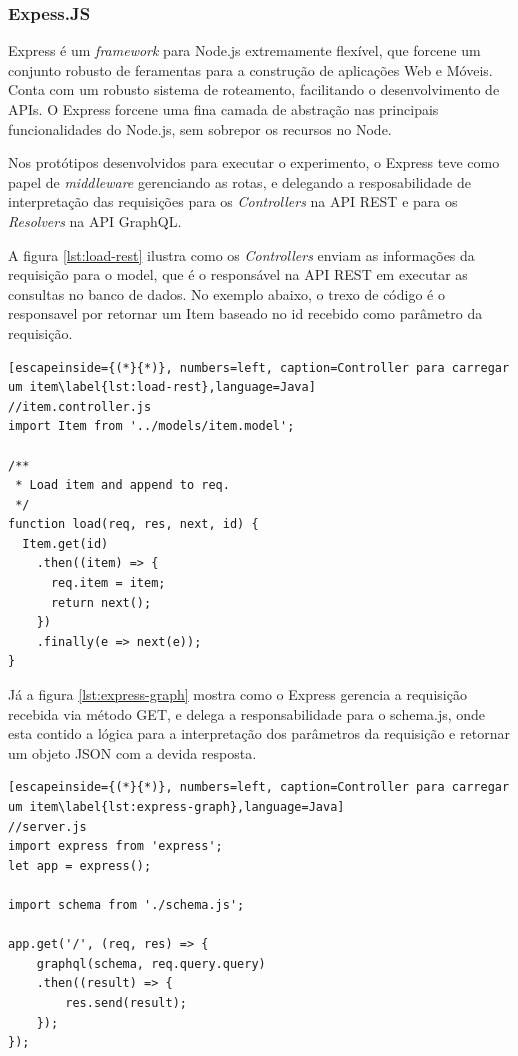 \subsubsection*{Expess.JS}

Express é um \textit{framework} para Node.js extremamente flexível, que forcene um conjunto robusto de feramentas para a construção de aplicações Web e Móveis. Conta com um robusto sistema de roteamento, facilitando o desenvolvimento de APIs. O Express forcene uma fina camada de abstração nas principais funcionalidades do Node.js, sem sobrepor os recursos no Node.

Nos protótipos desenvolvidos para executar o experimento, o Express teve como papel de \textit{middleware} gerenciando as rotas, e delegando a resposabilidade de interpretação das requisições para os \textit{Controllers} na API REST e para os \textit{Resolvers} na API GraphQL.

A figura \ref{lst:load-rest} ilustra como os \textit{Controllers} enviam as informações da requisição para o model, que é o responsável na API REST em executar as consultas no banco de dados. No exemplo abaixo, o trexo de código é o responsavel por retornar um Item baseado no id recebido como parâmetro da requisição.

\begin{lstlisting}[escapeinside={(*}{*)}, numbers=left, caption=Controller para carregar um item\label{lst:load-rest},language=Java]
//item.controller.js
import Item from '../models/item.model';

/**
 * Load item and append to req.
 */
function load(req, res, next, id) {
  Item.get(id)
    .then((item) => {
      req.item = item;
      return next();
    })
    .finally(e => next(e));
}

\end{lstlisting}

Já a figura \ref{lst:express-graph} mostra como o Express gerencia a requisição recebida via método GET, e delega a responsabilidade para o schema.js, onde esta contido a lógica para a interpretação dos parâmetros da requisição e retornar um objeto JSON com a devida resposta.

\begin{lstlisting}[escapeinside={(*}{*)}, numbers=left, caption=Controller para carregar um item\label{lst:express-graph},language=Java]
//server.js
import express from 'express';
let app = express();

import schema from './schema.js';

app.get('/', (req, res) => {
    graphql(schema, req.query.query)
    .then((result) => {
        res.send(result);
    });
});

\end{lstlisting}

